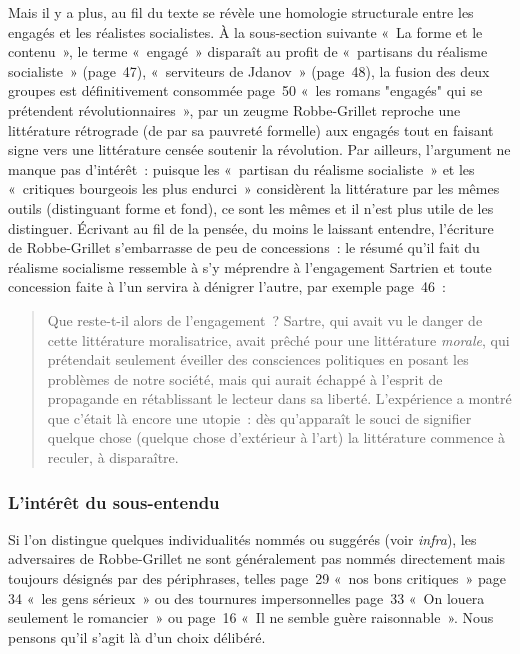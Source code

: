 \documentclass[12pt, a4paper]{article}
\begin{document}
Mais il y a plus, au fil du texte se révèle une homologie structurale entre les engagés et les réalistes socialistes. À la sous-section suivante «~La forme et le contenu~», le terme «~engagé~» disparaît au profit de «~partisans du réalisme socialiste~» (page~47), «~serviteurs de Jdanov~» (page~48), la fusion des deux groupes est définitivement consommée page~50 «~les romans "engagés" qui se prétendent révolutionnaires~», par un zeugme Robbe-Grillet reproche une littérature rétrograde (de par sa pauvreté formelle) aux engagés tout en faisant signe vers une littérature censée soutenir la révolution. Par ailleurs, l'argument ne manque pas d'intérêt~: puisque les «~partisan du réalisme socialiste~» et les «~critiques bourgeois les plus endurci~» considèrent la littérature par les mêmes outils (distinguant forme et fond), ce sont les mêmes et il n'est plus utile de les distinguer. Écrivant au fil de la pensée, du moins le laissant entendre, l'écriture de Robbe-Grillet s'embarrasse de peu de concessions~: le résumé qu'il fait du réalisme socialisme ressemble à s'y méprendre à l'engagement Sartrien et toute concession faite à l'un servira à dénigrer l'autre, par exemple page~46~: 
\begin{quote}
    Que reste-t-il alors de l’engagement~? Sartre, qui avait vu le danger de cette littérature moralisatrice, avait prêché pour une littérature \textit{morale}, qui prétendait seulement éveiller des consciences politiques en posant les problèmes de notre société, mais qui aurait échappé à l’esprit de propagande en rétablissant le lecteur dans sa liberté. L’expérience a montré que c’était là encore une utopie~: dès qu’apparaît le souci de signifier quelque chose (quelque chose d’extérieur à l’art) la littérature commence à reculer, à disparaître.
\end{quote}



\subsubsection{L'intérêt du sous-entendu}
Si l'on distingue quelques individualités nommés ou suggérés (voir \textit{infra}), les adversaires de Robbe-Grillet ne sont généralement pas nommés directement mais toujours désignés par des périphrases, telles page~29 «~nos bons critiques~» page 34 «~les gens sérieux~» ou des tournures impersonnelles page~33 «~On louera seulement le romancier~» ou page~16 «~Il ne semble guère raisonnable~». Nous pensons qu'il s'agit là d'un choix délibéré.
\end{document}
